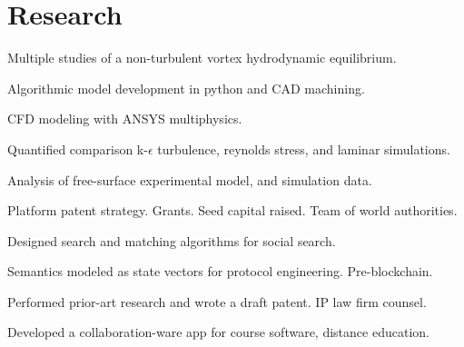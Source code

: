 \documentclass[letterpaper]{deedy-resume} %
\begin{document}
\hfill
\begin{minipage}[t]{1\textwidth} %


\section{Research}




\vspace{\topsep} %
Multiple studies of a non-turbulent vortex hydrodynamic equilibrium.

\vspace{\topsep} %
\begin{tightitemize}
\item Algorithmic model development in python and CAD machining. 
\item CFD modeling with ANSYS multiphysics. 
\item Quantified comparison k-$\epsilon$ turbulence, reynolds stress, and laminar simulations.
\item Analysis of free-surface experimental model, and simulation data.
\item Platform patent strategy.  Grants. Seed capital raised. Team of world authorities.
\end{tightitemize}

\sectionspace %



\begin{tightitemize}
\item Designed search and matching algorithms for social search.
\item Semantics modeled as state vectors for protocol engineering.  Pre-blockchain.
\item Performed prior-art research and wrote a draft patent. IP law firm counsel.
\item Developed a collaboration-ware app for course software, distance education.
\end{tightitemize}


\end{minipage}
\end{document}
